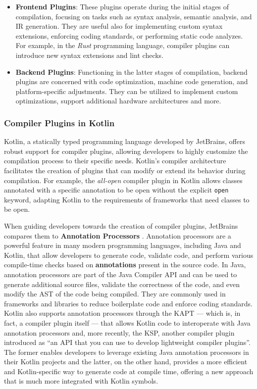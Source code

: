 \documentclass[12pt,a4paper,openright,twoside]{book}
\begin{document}
\begin{itemize}
  \item \textbf{Frontend Plugins}: These plugins operate during the initial
  stages of compilation, focusing on tasks such as syntax analysis, semantic
  analysis, and \ac{IR} generation. They are useful also for
  implementing custom syntax extensions, enforcing coding standards, or
  performing static code analyzes. For example, in the \emph{Rust} programming
  language, compiler plugins can introduce new syntax extensions and lint
  checks. 

  \item \textbf{Backend Plugins}: Functioning in the latter stages of
  compilation, backend plugins are concerned with code optimization, machine
  code generation, and platform-specific adjustments. They can be utilized to
  implement custom optimizations, support additional hardware
  architectures and more.
\end{itemize}

\subsubsection{Compiler Plugins in Kotlin}

Kotlin, a statically typed programming language developed by JetBrains, offers
robust support for compiler plugins, allowing developers to highly customize the
compilation process to their specific needs. 
%
Kotlin's compiler architecture facilitates the creation of plugins that can
modify or extend its behavior during compilation. For example, the
\emph{all-open} compiler plugin in Kotlin allows classes annotated with a
specific annotation to be open without the explicit \lstinline{open} keyword,
adapting Kotlin to the requirements of frameworks that need classes to be
open. 

When guiding developers towards the creation of compiler plugins, JetBrains
compares them to \textbf{Annotation Processors}
\cite{JetBrains:KotlinCompilerPlugin}. Annotation processors are a powerful
feature in many modern programming languages, including Java and Kotlin, that
allow developers to generate code, validate code, and perform various
compile-time checks based on \textbf{annotations} present in the source code.
%
In Java, annotation processors are part of the Java Compiler API and can be used
to generate additional source files, validate the correctness of the code, and
even modify the \ac{AST} of the code being compiled. They are
commonly used in frameworks and libraries to reduce boilerplate code and enforce
coding standards.
%
Kotlin also supports annotation processors through the \ac{KAPT} — which is, in
fact, a compiler plugin itself — that allows Kotlin code to interoperate with
Java annotation processors and, more recently, the \ac{KSP}, another compiler
plugin introduced as ``an API that you can use to develop lightweight compiler
plugins''. The former enables developers to leverage existing Java annotation
processors in their Kotlin projects and the latter, on the other hand, provides
a more efficient and Kotlin-specific way to generate code at compile time,
offering a new approach that is much more integrated with Kotlin symbols.
\end{document}
